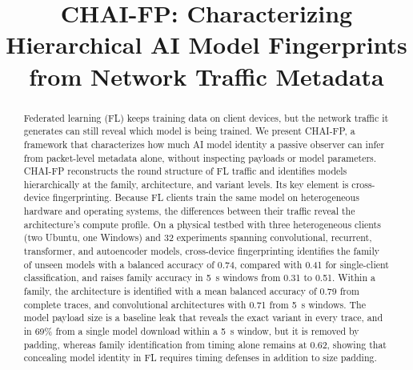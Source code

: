 \documentclass[conference]{IEEEtran}
\begin{document}
\title{CHAI-FP: Characterizing Hierarchical AI Model Fingerprints from Network Traffic Metadata}

\author{
}

\maketitle

\begin{abstract}
Federated learning (FL) keeps training data on client devices, but the network
traffic it generates can still reveal which model is being trained. We present
CHAI-FP, a framework that characterizes how much AI model identity a passive
observer can infer from packet-level metadata alone, without inspecting payloads
or model parameters. CHAI-FP reconstructs the round structure of FL traffic and
identifies models hierarchically at the family, architecture, and variant
levels. Its key element is cross-device fingerprinting. Because FL clients train the
same model on heterogeneous hardware and operating systems, the differences
between their traffic reveal the architecture's compute profile. On a physical testbed with three
heterogeneous clients (two Ubuntu, one Windows) and 32 experiments spanning convolutional, recurrent,
transformer, and autoencoder models, cross-device fingerprinting identifies the
family of unseen models with a balanced accuracy of 0.74, compared with 0.41 for
single-client classification, and raises family accuracy in 5~s windows from 0.31
to 0.51. Within a family, the architecture is identified with a mean balanced
accuracy of 0.79 from complete traces, and convolutional architectures with 0.71
from 5~s windows. The model payload size is a baseline leak that reveals the
exact variant in every trace, and in 69\% from a single model download within
a 5~s window, but it is removed by padding, whereas family identification from
timing alone remains at 0.62, showing that concealing model
identity in FL requires timing defenses in addition to size padding.
\end{abstract}
\end{document}
